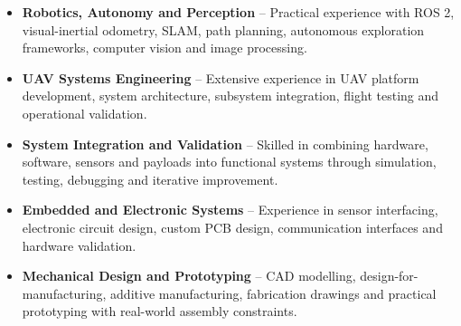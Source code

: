 \documentclass[10pt,a4paper]{article}
\begin{document}
{  \begin{itemize}
    \item \textbf{Robotics, Autonomy and Perception} -- Practical experience with ROS 2, visual-inertial odometry, SLAM, path planning, autonomous exploration frameworks, computer vision and image processing.
    \item \textbf{UAV Systems Engineering} -- Extensive experience in UAV platform development, system architecture, subsystem integration, flight testing and operational validation.
    \item \textbf{System Integration and Validation} -- Skilled in combining hardware, software, sensors and payloads into functional systems through simulation, testing, debugging and iterative improvement.
    \item \textbf{Embedded and Electronic Systems} -- Experience in sensor interfacing, electronic circuit design, custom PCB design, communication interfaces and hardware validation.
    \item \textbf{Mechanical Design and Prototyping} -- CAD modelling, design-for-manufacturing, additive manufacturing, fabrication drawings and practical prototyping with real-world assembly constraints.
  \end{itemize}




}
\end{document}
